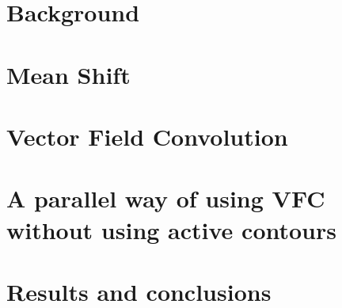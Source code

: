 \documentclass[11pt,a4paper,twoside,openright,titlepage]{book}
\begin{document}
\frontmatter




\cleardoublepage
\setcounter{page}{1}

\cleardoublepage
\setcounter{page}{1}
\tableofcontents

\mainmatter


\part{Background}

\part{Mean Shift}

\part{Vector Field Convolution}

\part{A parallel way of using VFC without using active contours}

\part{Results and conclusions}


\backmatter

\listoffigures
\listoftables
\listoflistings
{}

\printbibliography[heading=bibintoc]
\end{document}
